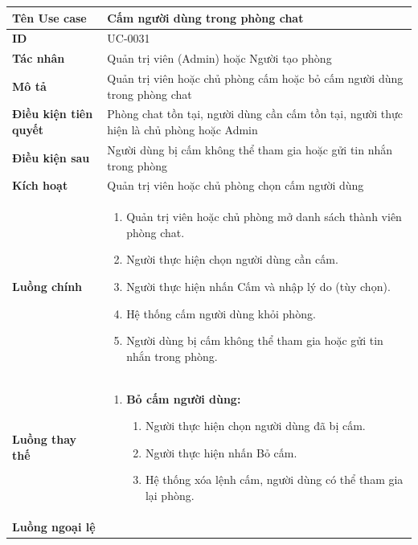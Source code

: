 {
\renewcommand{\arraystretch}{1.5}

\begin{tabularx}{\textwidth}{|>{\raggedright\arraybackslash}X|>{\raggedright\arraybackslash}X|}
\hline
\textbf{Tên Use case} & Cấm người dùng trong phòng chat \\
\hline
\textbf{ID} & UC-0031 \\
\hline
\textbf{Tác nhân} & Quản trị viên (Admin) hoặc Người tạo phòng \\
\hline
\textbf{Mô tả} & Quản trị viên hoặc chủ phòng cấm hoặc bỏ cấm người dùng trong phòng chat \\
\hline
\textbf{Điều kiện tiên quyết} & Phòng chat tồn tại, người dùng cần cấm tồn tại, người thực hiện là chủ phòng hoặc Admin \\
\hline
\textbf{Điều kiện sau} & Người dùng bị cấm không thể tham gia hoặc gửi tin nhắn trong phòng \\
\hline
\textbf{Kích hoạt} & Quản trị viên hoặc chủ phòng chọn cấm người dùng \\
\hline
\textbf{Luồng chính} &
\begin{enumerate}
    \item Quản trị viên hoặc chủ phòng mở danh sách thành viên phòng chat.
    \item Người thực hiện chọn người dùng cần cấm.
    \item Người thực hiện nhấn Cấm và nhập lý do (tùy chọn).
    \item Hệ thống cấm người dùng khỏi phòng.
    \item Người dùng bị cấm không thể tham gia hoặc gửi tin nhắn trong phòng.
\end{enumerate} \\
\hline
\textbf{Luồng thay thế} &
\begin{enumerate}
    \item \textbf{Bỏ cấm người dùng:}
    \begin{enumerate}
        \item[2A.] Người thực hiện chọn người dùng đã bị cấm.
        \item[3A.] Người thực hiện nhấn Bỏ cấm.
        \item[4A.] Hệ thống xóa lệnh cấm, người dùng có thể tham gia lại phòng.
    \end{enumerate}
\end{enumerate} \\
\hline
\textbf{Luồng ngoại lệ} &
\begin{enumerate}

\end{enumerate}
\end{tabularx}}
